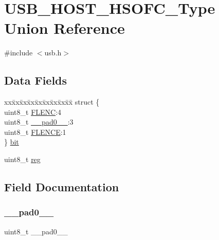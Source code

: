 \hypertarget{union_u_s_b___h_o_s_t___h_s_o_f_c___type}{}\section{U\+S\+B\+\_\+\+H\+O\+S\+T\+\_\+\+H\+S\+O\+F\+C\+\_\+\+Type Union Reference}
\label{union_u_s_b___h_o_s_t___h_s_o_f_c___type}


{\ttfamily \#include $<$usb.\+h$>$}

\subsection*{Data Fields}
\begin{DoxyCompactItemize}
\item 
\begin{tabbing}
xx\=xx\=xx\=xx\=xx\=xx\=xx\=xx\=xx\=\kill
struct \{\\
\>uint8\_t \mbox{\hyperlink{union_u_s_b___h_o_s_t___h_s_o_f_c___type_a825bf5741bf988b6171a1c41025e5af9}{FLENC}}:4\\
\>uint8\_t \mbox{\hyperlink{union_u_s_b___h_o_s_t___h_s_o_f_c___type_a8b4eebe79ded0459acec2f4950102ba3}{\_\_pad0\_\_}}:3\\
\>uint8\_t \mbox{\hyperlink{union_u_s_b___h_o_s_t___h_s_o_f_c___type_ac39c6a845c103e5f50e3798563b68987}{FLENCE}}:1\\
\} \mbox{\hyperlink{union_u_s_b___h_o_s_t___h_s_o_f_c___type_ac39328f7e4a34eab8c0e5d15e9cea99b}{bit}}\\

\end{tabbing}\item 
uint8\+\_\+t \mbox{\hyperlink{union_u_s_b___h_o_s_t___h_s_o_f_c___type_a9428adc9af4653a2050e2536b55dec8d}{reg}}
\end{DoxyCompactItemize}


\subsection{Field Documentation}
\mbox{\label{union_u_s_b___h_o_s_t___h_s_o_f_c___type_a8b4eebe79ded0459acec2f4950102ba3}} 
\subsubsection{\texorpdfstring{\_\_pad0\_\_}{\_\_pad0\_\_}}
{\footnotesize\ttfamily uint8\+\_\+t \+\_\+\+\_\+pad0\+\_\+\+\_\+}

